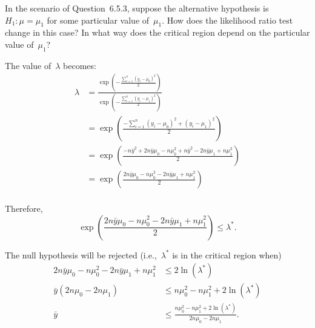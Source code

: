 \begin{problem}
   In the scenario of Question~6.5.3, suppose the alternative hypothesis is ${H_1: \mu = \mu_1}$ for some particular value of~$\mu_1$. How does the likelihood ratio test change in this case? In what way does the critical region depend on the particular value of~$\mu_1$?
\end{problem}

The value of~$\lambda$ becomes:
\begin{align}
  \lambda &= \frac{\exp\left( - \frac{\sum_{i=1}^{n} (y_i - \mu_0)^{2}}{2} \right) }{\exp\left( - \frac{\sum_{i=1}^{n} (y_i - \mu_1)^{2}}{2} \right) } \\
          &= \exp\left( \frac{ -\sum_{i=1}^{n} (y_i - \mu_0)^{2} + (y_i - \mu_1)^{2} }{2} \right) \\
          &= \exp\left( \frac{ -n\bar{y}^2 +2n\bar{y}\mu_0 - n\mu_0^{2} + n\bar{y}^2 - 2n\bar{y}\mu_1 + n\mu_1^{2} }{2} \right) \\
          &= \exp\left( \frac{ 2n\bar{y}\mu_0 - n\mu_0^{2} - 2n\bar{y}\mu_1 + n\mu_1^{2} }{2} \right) \\
\end{align}

Therefore,
\begin{equation}
  \exp\left( \frac{ 2n\bar{y}\mu_0 - n\mu_0^{2} - 2n\bar{y}\mu_1 + n\mu_1^{2} }{2} \right) \leq \lambda^* \text{.}
\end{equation}

The null hypothesis will be rejected (i.e.,~$\lambda^{*}$ is in the critical region when)
\begin{align}
  2n\bar{y}\mu_0 - n\mu_0^{2} - 2n\bar{y}\mu_1 + n\mu_1^{2} &\leq 2\ln (\lambda^*) \\
  \bar{y} (2n \mu_0 - 2n\mu_1) &\leq n\mu_0^{2} - n\mu_1^{2} + 2\ln (\lambda^*) \\
  \bar{y} &\leq \frac{n\mu_0^{2} - n\mu_1^{2} + 2\ln (\lambda^*)}{2n \mu_0 - 2n\mu_1} \text{.}
\end{align}
